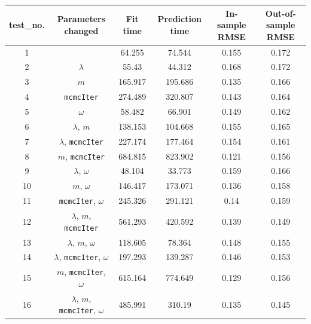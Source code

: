 \begin{table}[t]
\centering
\begin{tabular}{|c|c|c|c|c|c|}
\hline
\textbf{test_no.} & \textbf{Parameters changed} & \textbf{Fit time} & \textbf{Prediction time} & \textbf{In-sample RMSE} & \textbf{Out-of-sample RMSE} \\
\hline
1 &  & 64.255 & 74.544 & 0.155 & 0.172 \\
2 & $\lambda$ & 55.43 & 44.312 & 0.168 & 0.172 \\
3 & $m$ & 165.917 & 195.686 & 0.135 & 0.166 \\
4 & \texttt{mcmcIter} & 274.489 & 320.807 & 0.143 & 0.164 \\
5 & $\omega$ & 58.482 & 66.901 & 0.149 & 0.162 \\
6 & $\lambda$, $m$ & 138.153 & 104.668 & 0.155 & 0.165 \\
7 & $\lambda$, \texttt{mcmcIter} & 227.174 & 177.464 & 0.154 & 0.161 \\
8 & $m$, \texttt{mcmcIter} & 684.815 & 823.902 & 0.121 & 0.156 \\
9 & $\lambda$, $\omega$ & 48.104 & 33.773 & 0.159 & 0.166 \\
10 & $m$, $\omega$ & 146.417 & 173.071 & 0.136 & 0.158 \\
11 & \texttt{mcmcIter}, $\omega$ & 245.326 & 291.121 & 0.14 & 0.159 \\
12 & $\lambda$, $m$, \texttt{mcmcIter} & 561.293 & 420.592 & 0.139 & 0.149 \\
13 & $\lambda$, $m$, $\omega$ & 118.605 & 78.364 & 0.148 & 0.155 \\
14 & $\lambda$, \texttt{mcmcIter}, $\omega$ & 197.293 & 139.287 & 0.146 & 0.153 \\
15 & $m$, \texttt{mcmcIter}, $\omega$ & 615.164 & 774.649 & 0.129 & 0.156 \\
16 & $\lambda$, $m$, \texttt{mcmcIter}, $\omega$ & 485.991 & 310.19 & 0.135 & 0.145 \\
\hline
\end{tabular}
\end{table}
